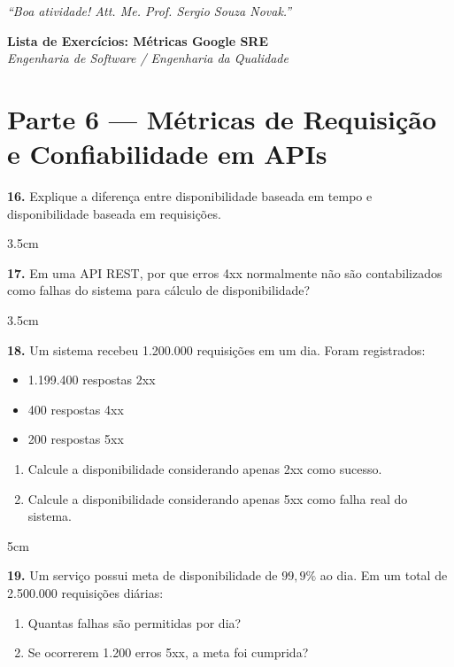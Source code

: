 \documentclass[12pt,a4paper,twoside]{report}
\begin{document}
\vspace{1cm}

\begin{center}
    \textit{“Boa atividade! Att. Me. Prof. Sergio Souza Novak.”}
\end{center}

\begin{center}
  {\Large \textbf{Lista de Exercícios: Métricas Google SRE}}\\[0.2cm]
  \textit{Engenharia de Software / Engenharia da Qualidade}
\end{center}

\vspace{0.4cm}

\section*{Parte 6 — Métricas de Requisição e Confiabilidade em APIs}

\textbf{16.} Explique a diferença entre disponibilidade baseada em tempo e disponibilidade baseada em requisições.
\begin{resposta}{3.5cm}
\end{resposta}

\textbf{17.} Em uma API REST, por que erros 4xx normalmente não são contabilizados como falhas do sistema para cálculo de disponibilidade?
\begin{resposta}{3.5cm}
\end{resposta}

\textbf{18.} Um sistema recebeu 1.200.000 requisições em um dia. 
Foram registrados:
\begin{itemize}
    \item 1.199.400 respostas 2xx
    \item 400 respostas 4xx
    \item 200 respostas 5xx
\end{itemize}

\begin{enumerate}[label=\alph*)]
    \item Calcule a disponibilidade considerando apenas 2xx como sucesso.
    \item Calcule a disponibilidade considerando apenas 5xx como falha real do sistema.
\end{enumerate}

\begin{resposta}{5cm}
\end{resposta}

\textbf{19.} Um serviço possui meta de disponibilidade de $99,9\%$ ao dia. 
Em um total de 2.500.000 requisições diárias:
\begin{enumerate}[label=\alph*)]
    \item Quantas falhas são permitidas por dia?
    \item Se ocorrerem 1.200 erros 5xx, a meta foi cumprida?
\end{enumerate}
\end{document}
